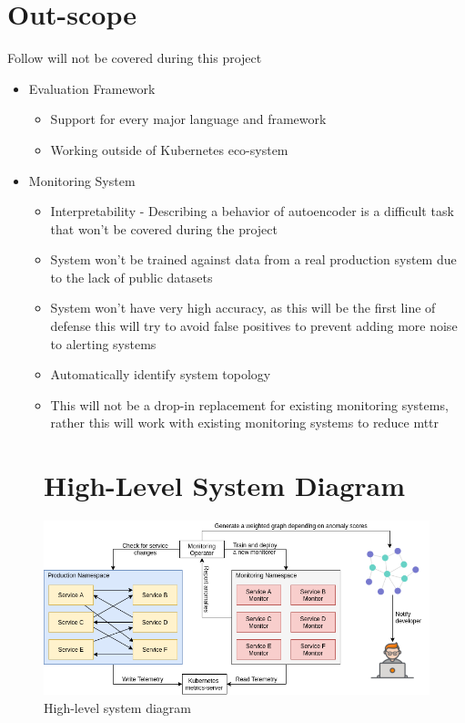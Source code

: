 


\section{Out-scope}
Follow will not be covered during this project
\begin{itemize}
    \item Evaluation Framework
    \begin{itemize}
        \item Support for every major language and framework
        \item Working outside of Kubernetes eco-system
    \end{itemize}
    \item Monitoring System
    \begin{itemize}
        \item Interpretability - Describing a behavior of autoencoder is a difficult task that won't be covered during the project
        \item System won't be trained against data from a real production system due to the lack of public datasets
        \item System won't have very high accuracy, as this will be the first line of defense this will try to avoid false positives to prevent adding more noise to alerting systems  \item Automatically identify system topology
        \item This will not be a drop-in replacement for existing monitoring systems, rather this will work with existing monitoring systems to reduce \ac{mttr}
    \end{itemize}
\end{itemize}

\begin{figure}[!ht]
    \section{High-Level System Diagram}
    \centering
    \includegraphics[width=16cm]{assets/High-level-system-diagram.png}
    \caption{High-level system diagram}
    \label{fig:high-level-diagram}
\end{figure}